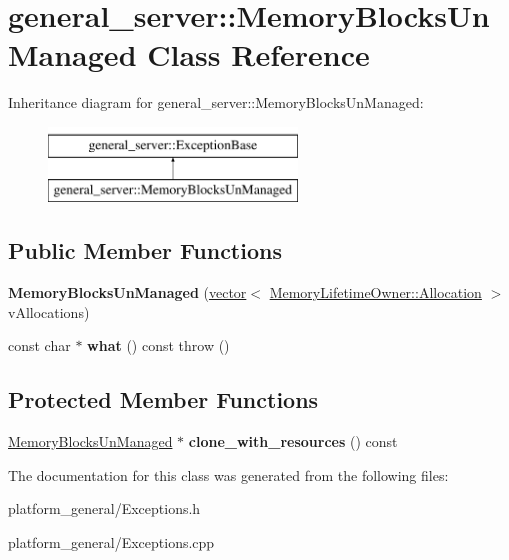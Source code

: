 \hypertarget{classgeneral__server_1_1MemoryBlocksUnManaged}{\section{general\-\_\-server\-:\-:\-Memory\-Blocks\-Un\-Managed \-Class \-Reference}
\label{classgeneral__server_1_1MemoryBlocksUnManaged}
}
\-Inheritance diagram for general\-\_\-server\-:\-:\-Memory\-Blocks\-Un\-Managed\-:\begin{figure}[H]
\begin{center}
\leavevmode
\includegraphics[height=2.000000cm]{classgeneral__server_1_1MemoryBlocksUnManaged}
\end{center}
\end{figure}
\subsection*{\-Public \-Member \-Functions}
\begin{DoxyCompactItemize}
\item 
\hypertarget{classgeneral__server_1_1MemoryBlocksUnManaged_ae51cbfe39cdedca13fdadeab289675a0}{{\bfseries \-Memory\-Blocks\-Un\-Managed} (\hyperlink{classvector}{vector}$<$ \hyperlink{structgeneral__server_1_1MemoryLifetimeOwner_1_1Allocation}{\-Memory\-Lifetime\-Owner\-::\-Allocation} $>$ v\-Allocations)}\label{classgeneral__server_1_1MemoryBlocksUnManaged_ae51cbfe39cdedca13fdadeab289675a0}

\item 
\hypertarget{classgeneral__server_1_1MemoryBlocksUnManaged_a254cff2cf7d0a2058dd99e543a2bf3a6}{const char $\ast$ {\bfseries what} () const   throw ()}\label{classgeneral__server_1_1MemoryBlocksUnManaged_a254cff2cf7d0a2058dd99e543a2bf3a6}

\end{DoxyCompactItemize}
\subsection*{\-Protected \-Member \-Functions}
\begin{DoxyCompactItemize}
\item 
\hypertarget{classgeneral__server_1_1MemoryBlocksUnManaged_a3f5b3238fb4e554e917b18af93f0e68b}{\hyperlink{classgeneral__server_1_1MemoryBlocksUnManaged}{\-Memory\-Blocks\-Un\-Managed} $\ast$ {\bfseries clone\-\_\-with\-\_\-resources} () const }\label{classgeneral__server_1_1MemoryBlocksUnManaged_a3f5b3238fb4e554e917b18af93f0e68b}

\end{DoxyCompactItemize}


\-The documentation for this class was generated from the following files\-:\begin{DoxyCompactItemize}
\item 
platform\-\_\-general/\-Exceptions.\-h\item 
platform\-\_\-general/\-Exceptions.\-cpp\end{DoxyCompactItemize}
